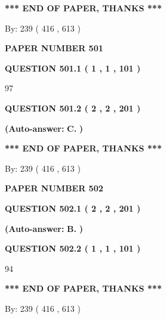 \documentclass{ctexart}
\begin{document}
 
   
   
   
   
\vspace{1.0in} 
{\textbf{\large{ *** END OF PAPER, THANKS *** }}} 
   
   
\hspace{1.0in} By: 
 239 ( 416 ,  613 )
   
   
   
   
\newpage 
\setcounter{page}{ 
   501001 } 
   
   
 {\textbf{ \Large{ PAPER NUMBER  501  }}}
   
   
   
   
  
  
{\textbf{\large{QUESTION
501.1 
 ( 1 , 1 , 101 )
}}}

97
  
  
{\textbf{\large{QUESTION
501.2 
 ( 2 , 2 , 201 )
}}}
 
 
{\textbf{(Auto-answer:}}
{\textbf{\large{
C.}}}
{\textbf{)}}
 
 
   
   
   
   
\vspace{1.0in} 
{\textbf{\large{ *** END OF PAPER, THANKS *** }}} 
   
   
\hspace{1.0in} By: 
 239 ( 416 ,  613 )
   
   
   
   
\newpage 
\setcounter{page}{ 
   502001 } 
   
   
 {\textbf{ \Large{ PAPER NUMBER  502  }}}
   
   
   
   
  
  
{\textbf{\large{QUESTION
502.1 
 ( 2 , 2 , 201 )
}}}
 
 
{\textbf{(Auto-answer:}}
{\textbf{\large{
B.}}}
{\textbf{)}}
 
 
  
  
{\textbf{\large{QUESTION
502.2 
 ( 1 , 1 , 101 )
}}}

94
   
   
   
   
\vspace{1.0in} 
{\textbf{\large{ *** END OF PAPER, THANKS *** }}} 
   
   
\hspace{1.0in} By: 
 239 ( 416 ,  613 )
   
   
   
   
\newpage 
\setcounter{page}{ 
   503001 } 
   
\end{document}
